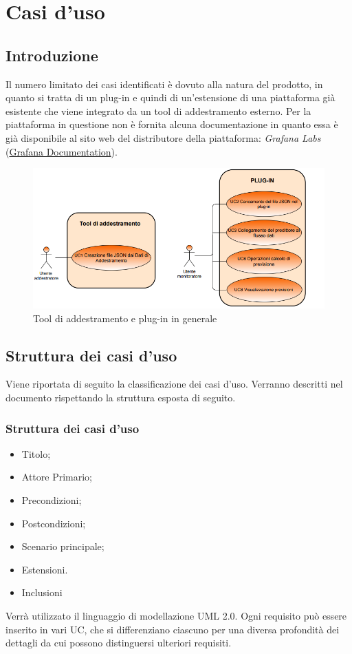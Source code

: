 \section{Casi d'uso}

	\subsection{Introduzione}
Il numero limitato dei casi identificati è dovuto alla natura del prodotto, in quanto si tratta di un plug-in e quindi di un’estensione di una piattaforma già esistente che viene integrato da un tool di addestramento esterno.
Per la piattaforma in questione non è fornita alcuna documentazione in quanto essa è già disponibile al sito web del distributore della piattaforma: \emph{Grafana Labs} (\href{https://grafana.com/docs/grafana/latest/}{Grafana Documentation}). 

	\begin{figure}[H]
		\centering
		\includegraphics[scale=0.80]{../Analisi_dei_requisiti/img/Diagrammi_UML/tool_e_plug-in.png}
		\caption{Tool di addestramento e plug-in in generale}
	\end{figure}

	\subsection{Struttura dei casi d'uso}
Viene riportata di seguito la classificazione dei casi d’uso. Verranno descritti nel documento rispettando la struttura esposta di seguito.
	
		\subsubsection{Struttura dei casi d'uso}
		\begin{itemize}
			\item Titolo; 
 			\item Attore Primario; 
			\item Precondizioni; 
 			\item Postcondizioni; 
 			\item Scenario principale; 
 			\item Estensioni.
			\item Inclusioni
 		\end{itemize}
Verrà utilizzato il linguaggio di modellazione UML 2.0. 
Ogni requisito può essere inserito in vari UC, che si differenziano ciascuno per una diversa profondità dei dettagli da cui possono distinguersi ulteriori requisiti. 

